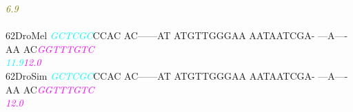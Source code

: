 \documentclass[11pt,twoside,reqno,a4paper]{article}
\begin{document}
{\hspace*{4\charwidth}\hspace*{7\charwidth}\hspace*{1\charwidth}\hspace*{13\charwidth}\textit{\textcolor{olive}{6.9}}\hspace*{1\charwidth}\hspace*{1\charwidth}\hspace*{1\charwidth}\hspace*{1\charwidth}\hspace*{1\charwidth}\\
\\
62\hspace*{2\charwidth}DroMel	\textit{\textcolor{cyan}{G}}\textit{\textcolor{cyan}{C}}\textit{\textcolor{cyan}{T}}\textit{\textcolor{cyan}{C}}\textit{\textcolor{cyan}{G}}\textit{\textcolor{cyan}{C}}CCAC	AC------AT	ATGTTGGGAA	AATAATCGA-	---A----AA	AC\textit{\textcolor{magenta}{G}}\textit{\textcolor{magenta}{G}}\textit{\textcolor{magenta}{T}}\textit{\textcolor{magenta}{T}}\textit{\textcolor{magenta}{T}}\textit{\textcolor{magenta}{G}}\textit{\textcolor{magenta}{T}}\textit{\textcolor{magenta}{C}}	\\
\hspace*{4\charwidth}\hspace*{7\charwidth}\hspace*{0\charwidth}\textit{\textcolor{cyan}{11.9}}\hspace*{1\charwidth}\hspace*{1\charwidth}\hspace*{1\charwidth}\hspace*{1\charwidth}\hspace*{1\charwidth}\hspace*{48\charwidth}\textit{\textcolor{magenta}{12.0}}\hspace*{1\charwidth}\\
62\hspace*{2\charwidth}DroSim	\textit{\textcolor{cyan}{G}}\textit{\textcolor{cyan}{C}}\textit{\textcolor{cyan}{T}}\textit{\textcolor{cyan}{C}}\textit{\textcolor{cyan}{G}}\textit{\textcolor{cyan}{C}}CCAC	AC------AT	ATGTTGGGAA	AATAATCGA-	---A----AA	AC\textit{\textcolor{magenta}{G}}\textit{\textcolor{magenta}{G}}\textit{\textcolor{magenta}{T}}\textit{\textcolor{magenta}{T}}\textit{\textcolor{magenta}{T}}\textit{\textcolor{magenta}{G}}\textit{\textcolor{magenta}{T}}\textit{\textcolor{magenta}{C}}	\\
\hspace*{4\charwidth}\hspace*{7\charwidth}\hspace*{1\charwidth}\hspace*{1\charwidth}\hspace*{1\charwidth}\hspace*{1\charwidth}\hspace*{1\charwidth}\hspace*{52\charwidth}\textit{\textcolor{magenta}{12.0}}\hspace*{1\charwidth}\\
}
\end{document}
